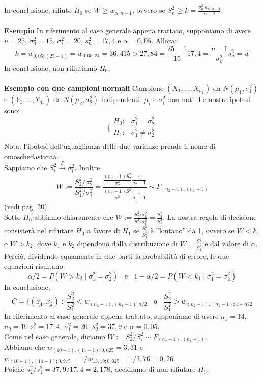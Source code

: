 \noindent In conclusione, rifiuto $H_0$ se $W \geq w_{\alpha;n-1}$, ovvero se $S_n^2 \geq k = \frac{ \sigma_0^2 \: w_{\alpha,n-1}}{n-1}$.\\
\\
\textbf{Esempio} In riferimento al caso generale appena trattato, supponiamo di avere $n=25$, $\sigma_0^2=15$, $\sigma_1^2=20$, $s_n^2=17,4$ e $\alpha=0,05$. Allora:
$$k=w_{0,05;(25-1)} = w_{0,05;24} = 36,415 > 27,84 = \frac{25-1}{15} 17,4 = \frac{n-1}{\sigma_0^2} s_n^2 = w$$
In conclusione, non rifiutiamo $H_0$.\\
\\
\textbf{Esempio con due campioni normali} Campione $(X_1,...,X_{n_1})$ da $N(\mu_1,\sigma_1^2)$ e $(Y_1,...,Y_{n_2})$ da $N(\mu_2,\sigma_2^2)$ indipendenti. $\mu_i$ e $\sigma_i^2$ non noti. Le nostre ipotesi sono:
$$\bigg \{
\begin{array}{rl}
H_0: & \sigma_1^2=\sigma_2^2 \\
H_1: & \sigma_1^2 \neq \sigma_2^2 \\
\end{array}
$$
Nota: l'ipotesi dell'uguaglianza delle due varianze prende il nome di omoschedasticità.\\
Sappiamo che $S_i^2 \stackrel{P}{\rightarrow} \sigma_i^2$. Inoltre
$$W:= \frac{S_2^2 / \sigma_2^2}{S_1^2 / \sigma_1^2} = 
\frac{\frac{(n_2-1) S_2^2}{\sigma_2^2} \frac{1}{n_2-1}} {\frac{(n_1-1) S_1^2}{\sigma_1^2} \frac{1}{n_1-1}} 
\sim F_{(n_2-1),(n_1-1)}$$
(vedi pag. 20)\\
Sotto $H_0$ abbiamo chiaramente che $W:= \frac{S_2^2 / \sigma_2^2}{S_1^2 / \sigma_1^2} = \frac{S_2^2}{S_1^2}$. La nostra regola di decisione consisterà nel rifiutare $H_0$ a favore di $H_1$ se $\frac{S_2^2}{S_1^2}$ è ''lontano'' da 1, ovvero se $W<k_1$ o $W>k_2$, dove $k_1$ e $k_2$ dipendono dalla distribuzione di $W= \frac{S_2^2}{S_1^2}$ e dal valore di $\alpha$. Perciò, dividendo equamente in due parti la probabilità di errore, le due equazioni risultano:
$$\alpha/2 = P(W>k_2 \mid \sigma_1^2=\sigma_2^2) \; \; \text{ e } \; \; 1-\alpha/2 = P(W<k_1 \mid \sigma_1^2=\sigma_2^2)$$
In conclusione, 
$$C= \lbrace (\underline{x_1},\underline{x_2}) \; : \; \frac{S_2^2}{S_1^2} < w_{(n_2-1),(n_1-1);\alpha/2} \; \; \text{ o } \; \; \frac{S_2^2}{S_1^2} > w_{(n_2-1),(n_1-1);1-\alpha/2}$$
In riferimento al caso generale appena trattato, supponiamo di avere $n_1=14$, $n_2=10$ $s_1^2=17,4$, $\sigma_1^2=20$, $s_2^2=37,9$ e $\alpha=0,05$.\\
Come nel caso generale, diciamo $W:=S_2^2/S_1^2 \sim F_{(n_2-1),(n_1-1)}$.\\
Abbiamo che $w_{(10-1),(14-1);0,025}=3,31$ e $w_{(10-1),(14-1);0,975}=1/w_{13,19;0,025}=1/3,76=0,26$.\\
Poiché $s_2^2/s_1^2=37,9/17,4=2,178$, decidiamo di non rifiutare $H_0$.